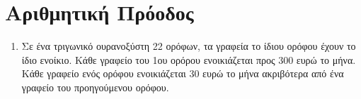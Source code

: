 



\everymath{\displaystyle}

\pagestyle{askhseis}




\begin{center}
  \minibox{\large\bfseries \textcolor{Col1}{Προβλήματα στις Ακολουθίες}}
\end{center}

\vspace{\baselineskip}


\section*{Αριθμητική Πρόοδος}

\begin{enumerate}
  \item Σε ένα τριγωνικό ουρανοξύστη 22 ορόφων, τα γραφεία το ίδιου ορόφου έχουν το ίδιο
    ενοίκιο. Κάθε γραφείο του 1ου ορόρου ενοικιάζεται προς 300 ευρώ το μήνα. Κάθε 
    γραφείο ενός ορόφου ενοικιάζεται 30 ευρώ το μήνα ακριβότερα από ένα γραφείο του 
    προηγούμενου ορόφου.
\end{enumerate}





